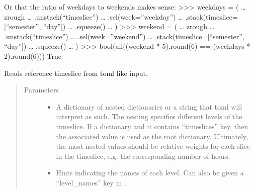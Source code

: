 \documentclass[letterpaper,10pt,english]{sphinxmanual}
\begin{document}
\begin{fulllineitems}
Or that the ratio of weekdays to weekends makes sense:
\textgreater{}\textgreater{}\textgreater{} weekdays = (
…    zrough
…    .unstack(“timeslice”)
…    .sel(week=”weekday”)
…    .stack(timeslice={[}“semester”, “day”{]})
…    .squeeze()
… )
\textgreater{}\textgreater{}\textgreater{} weekend = (
…    zrough
…    .unstack(“timeslice”)
…    .sel(week=”weekend”)
…    .stack(timeslice={[}“semester”, “day”{]})
…    .squeeze()
… )
\textgreater{}\textgreater{}\textgreater{} bool(all((weekend * 5).round(6) == (weekdays * 2).round(6)))
True

\end{fulllineitems}


\begin{fulllineitems}
\label{\detokenize{api:muse.timeslices.reference_timeslice}}
Reads reference timeslice from toml like input.
\begin{quote}\begin{description}
\item[{Parameters}] \leavevmode\begin{itemize}
\item {} 
 \textendash{} A dictionary of nested dictionaries or a string that toml will
interpret as such. The nesting specifies different levels of the timeslice.
If a dictionary and it contains “timeslices” key, then the associated value
is used as the root dictionary. Ultimately, the most nested values should be
relative weights for each slice in the timeslice, e.g. the corresponding
number of hours.

\item {} 
 \textendash{} Hints indicating the names of each level. Can also be given a
“level\_names” key in .


\end{itemize}
\end{description}
\end{quote}
\end{fulllineitems}
\end{document}
